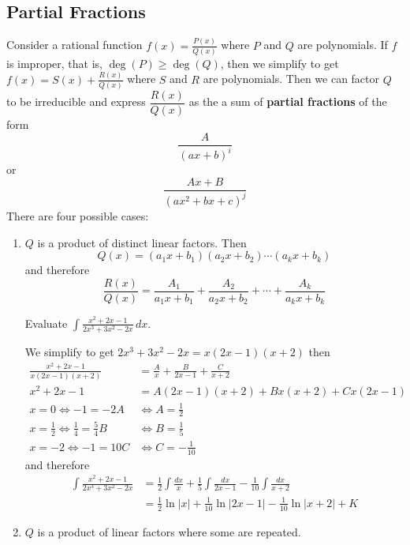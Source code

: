 \subsection{Partial Fractions}

Consider a rational function \(\displaystyle{f(x)=\frac{P(x)}{Q(x)}}\) where
\(P\) and \(Q\) are polynomials.
If \(f\) is improper, that is, \(\deg(P)\geq\deg(Q)\), then we simplify to get
\(\displaystyle{f(x)=S(x)+\frac{R(x)}{Q(x)}}\) where \(S\) and \(R\) are
polynomials.
Then we can factor \(Q\) to be irreducible and express \(\dfrac{R(x)}{Q(x)}\)
as the a sum of \textbf{partial fractions} of the form
\[\frac{A}{(ax+b)^i}\]
or
\[\frac{Ax+B}{(ax^2+bx+c)^j}\]
There are four possible cases:
\begin{enumerate}
    \item \(Q\) is a product of distinct linear factors.
    Then
    \[Q(x)=(a_1 x+b_1)(a_2 x+b_2)\cdots(a_k x+b_k)\]
    and therefore
    \[\frac{R(x)}{Q(x)}=\frac{A_1}{a_1 x+b_1}+\frac{A_2}{a_2 x+b_2}+\cdots+
    \frac{A_k}{a_k x+b_k}\]
    \begin{problem}
        Evaluate \(\displaystyle{\int\frac{x^2+2x-1}{2x^3+3x^2-2x}\,dx}\).
    \end{problem}
    \begin{solution}
        We simplify to get \(2x^3+3x^2-2x=x(2x-1)(x+2)\) then
        \begin{align*}
            \frac{x^2+2x-1}{x(2x-1)(x+2)} &=
            \frac{A}{x}+\frac{B}{2x-1}+\frac{C}{x+2} \\
            x^2+2x-1 &= A(2x-1)(x+2)+Bx(x+2)+Cx(2x-1) \\
            x=0\iff -1=-2A &\iff A=\frac{1}{2} \\
            x=\frac{1}{2}\iff \frac{1}{4}=\frac{5}{4}B &\iff B=\frac{1}{5} \\
            x=-2\iff -1=10C &\iff C=-\frac{1}{10}
        \end{align*}
        and therefore
        \begin{align*}
            \int\frac{x^2+2x-1}{2x^3+3x^2-2x}
            &= \frac{1}{2}\int\frac{dx}{x}+\frac{1}{5}\int\frac{dx}{2x-1}
            -\frac{1}{10}\int\frac{dx}{x+2} \\
            &= \frac{1}{2}\ln|x|+\frac{1}{10}\ln|2x-1|
            -\frac{1}{10}\ln|x+2|+K
        \end{align*}
    \end{solution}    
    \item \(Q\) is a product of linear factors where some are repeated.

\end{enumerate}
